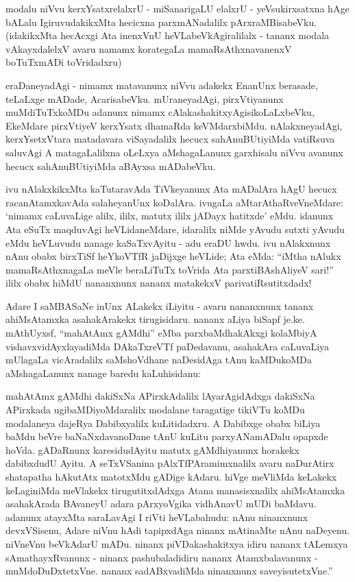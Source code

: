 modalu niVvu kerxYsatxrelalxrU - miSanarigaLU elalxrU - yeVsukirxsatxna hAge bALalu IgiruvudakikxMta hecicxna parxmANadalilx pArxraMBisabeVku. (idakikxMta hecAcxgi Ata inenxVnU heVLabeVkAgiralilalx - tananx modala vAkayxdalelxV avaru namamx korategaLa mamaRsAthxnavanenxV boTuTxmADi toVridadxru)

eraDaneyadAgi - nimamx matavanunx niVvu adakekx EnanUnx berasade, teLaLxge mADade, AcarisabeVku. mUraneyadAgi, pirxVtiyanunx muMdiTuTxkoMDu adanunx nimamx cAlakashakitxyAgisikoLaLxbeVku, EkeMdare pirxVtiyeV kerxYsatx dhamaRda keVMdarxbiMdu. nAlakxneyadAgi, kerxYsetxVtara matadavara viSayadalilx hecucx sahAnuBUtiyiMda vatiRsuva saluvAgi A matagaLalilxna oLeLxya aMshagaLanunx garxhisalu niVvu avanunx hecucx sahAnuBUtiyiMda aBAyxsa mADabeVku.

ivu nAlakxkikxMta kaTutaravAda TiVkeyanunx Ata mADalAra hAgU hecucx racanAtamxkavAda salaheyanUnx koDalAra. ivugaLa aMtarAthaRveVneMdare: `nimamx caLuvaLige alilx, ililx, matutx ililx jADayx hatitxde' eMdu. idanunx Ata eSuTx maqduvAgi heVLidaneMdare, idaralilx niMde yAvudu sutxti yAvudu eMdu heVLuvudu nanage kaSaTxvAyitu - adu eraDU hwdu. ivu nAlakxnunx nAnu obabx birxTiSf heYkoVTfR jaDijxge heVLide; Ata eMda: ``iMtha nAlukx mamaRsAthxnagaLa meVle beraLiTuTx toVrida Ata parxtiBAshAliyeV sari!'' ililx obabx hiMdU nananxnunx nananx matakekxV parivatiRsutitxdadx!

Adare I saMBASaNe inUnx ALakekx iLiyitu - avaru nananxnunx tananx ahiMsAtamxka asahakArakekx tirugisidaru. nananx aLiya biSapf je.ke. mAthUyxsf, ``mahAtAmx gAMdhi'' eMba parxbaMdhakAkxgi kolaMbiyA vishavxvidAyxlayadiMda DAkaTxreVTf paDedavanu, asahakAra caLuvaLiya mUlagaLa vicAradalilx saMshoVdhane naDesidAga tAnu kaMDukoMDa aMshagaLanunx nanage baredu kaLuhisidanu: 

\begin{minipage}[c]{1cm}
\quad
\end{minipage}
\begin{minipage}[c]{8.5cm}
mahAtAmx gAMdhi dakiSxNa APirxkAdalilx lAyarAgidAdxga dakiSxNa APirxkada ugibaMDiyoMdaralilx modalane taragatige tikiVTu koMDu modalaneya dajeRya Dabibxyalilx kuLitidadxru. A Dabibxge obabx biLiya baMdu beVre baNaNxdavanoDane tAnU kuLitu parxyANamADalu opapxde hoVda. gADaRnunx karesidudAyitu matutx gAMdhiyanunx horakekx dabibxdudU Ayitu. A seTxVSanina pAlxTfPAramimxnalilx avaru naDurAtirx shatapatha hAkutAtx matotxMdu gADige kAdaru. hiVge meVliMda keLakekx keLaginiMda meVlakekx tirugutitxdAdxga Atana manasisxnalilx ahiMsAtamxka asahakArada BAvaneyU adara pArxyoVgika vidhAnavU mUDi baMdavu. adanunx atayxMta saraLavAgi I riVti heVLabahudu: nAnu ninanxnunx devxVSisenu, Adare niVnu hAdi tapipxdAga ninanx mAtinaMte nAnu naDeyenu. niVneVnu beVkAdarU mADu. ninanx piVDakashakitxya idiru nananx tALemxya sAmathayxRvanunx - ninanx pashubaladidiru nananx Atamxbalavanunx - muMdoDuDxtetxVne. nananx sadABxvadiMda ninanxnunx saveyisutetxVne.''
\end{minipage}

